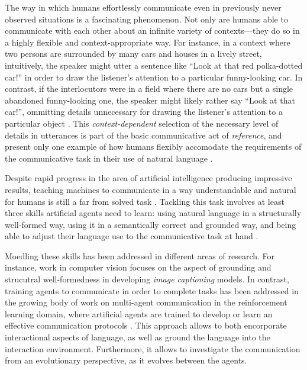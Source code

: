 The way in which humans effortlessly communicate even in previously never observed situations is a fascinating phenomenon. Not only are humans able to communicate with each other about an infinite variety of contexts---they do so in a highly flexible and context-appropriate way. For instance, in a context where two persons are surrounded by many cars and houses in a lively street, intuitively, the speaker might utter a sentence like ``Look at that red polka-dotted car!'' in order to draw the listener's attention to a particular funny-looking car. In contrast, if the interlocutors were in a field where there are no cars but a single abandoned funny-looking one, the speaker might likely rather say ``Look at that car!'', ommitting details unnecessary for drawing the listener's attention to a particular object \parencite[cf.][]{graf2016animal}. This \textit{context-dependent} selection of the necessary level of details in utterances is part of the basic communicative act of \textit{reference}, and present only one example of how humans flexibly accomodate the requirements of the communicative task in their use of natural language \parencite{searle1969speech}. 

Despite rapid progress in the area of artificial intelligence producing impressive results, teaching machines to communicate in a way understandable and natural for humans is still a far from solved task \parencite{lazaridou2020multi, lake2017building, lecun2015deep}. Tackling this task involves at least three skills artificial agents need to learn: using natural language in a structurally well-formed way, using it in a semantically correct and grounded way, and being able to adjust their language use to the communicative task at hand . 

Moedling these skills has been addressed in different areas of research. For instance, work in computer vision focuses on the aspect of grounding and strucutral well-formedness in developing \textit{image captioning} models.
In contrast, training agents to communicate in order to complete tasks has been addressed in the growing body of work on multi-agent communication in the reinforcement learning domain, where artificial agents are trained to develop or learn an effective communication protocols \parencite{foerster2016learning, lazaridou2020multi}.
This approach allows to both encorporate interactional aspects of language, as well as ground the language into the interaction environment. Furthermore, it allows to investigate the communication from an evolutionary perspective, as it evolves between the agents. 

